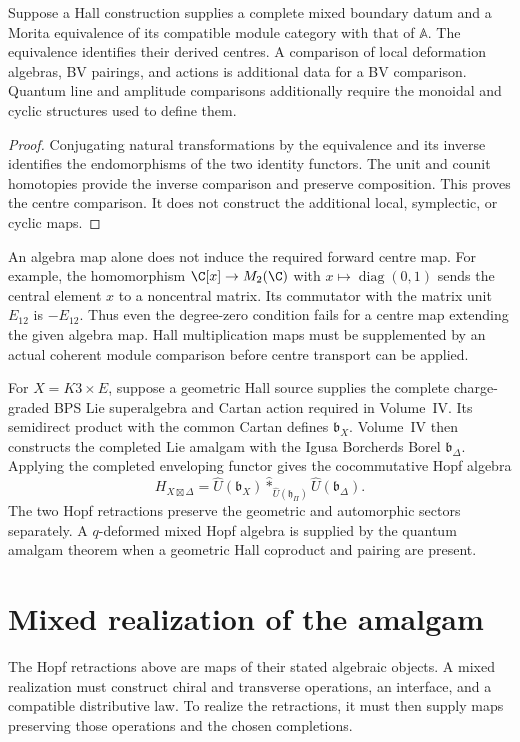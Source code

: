 \begin{proposition}
Suppose a Hall construction supplies a complete mixed boundary datum and a Morita equivalence of its compatible module category with that of $\mathbb A$. The equivalence identifies their derived centres. A comparison of local deformation algebras, BV pairings, and actions is additional data for a BV comparison. Quantum line and amplitude comparisons additionally require the monoidal and cyclic structures used to define them.
\end{proposition}
\begin{proof}
Conjugating natural transformations by the equivalence and its inverse identifies the endomorphisms of the two identity functors. The unit and counit homotopies provide the inverse comparison and preserve composition. This proves the centre comparison. It does not construct the additional local, symplectic, or cyclic maps.
\end{proof}

An algebra map alone does not induce the required forward centre map. For example, the homomorphism $\C[x]\to M_2(\C)$ with $x\mapsto\operatorname{diag}(0,1)$ sends the central element $x$ to a noncentral matrix. Its commutator with the matrix unit $E_{12}$ is $-E_{12}$. Thus even the degree-zero condition fails for a centre map extending the given algebra map. Hall multiplication maps must be supplemented by an actual coherent module comparison before centre transport can be applied.

For $X=K3\times E$, suppose a geometric Hall source supplies the complete charge-graded BPS Lie superalgebra and Cartan action required in Volume~IV. Its semidirect product with the common Cartan defines $\mathfrak b_X$. Volume~IV then constructs the completed Lie amalgam with the Igusa Borcherds Borel $\mathfrak b_\Delta$. Applying the completed enveloping functor gives the cocommutative Hopf algebra
\[
 H_{X\boxtimes\Delta}
 =\widehat U(\mathfrak b_X)
  \widehat *_{\widehat U(\mathfrak h_\Pi)}
  \widehat U(\mathfrak b_\Delta).
\]
The two Hopf retractions preserve the geometric and automorphic sectors separately.  A $q$-deformed mixed Hopf algebra is supplied by the quantum amalgam theorem when a geometric Hall coproduct and pairing are present.

\section{Mixed realization of the amalgam}
The Hopf retractions above are maps of their stated algebraic objects. A mixed realization must construct chiral and transverse operations, an interface, and a compatible distributive law. To realize the retractions, it must then supply maps preserving those operations and the chosen completions.


